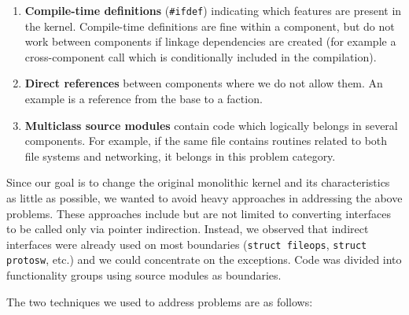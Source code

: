 \begin{enumerate}
\item   \textbf{Compile-time definitions} (\texttt{\#ifdef}) indicating
	which features are present in the kernel.  Compile-time
	definitions are fine within a component, but do not work
	between components if linkage dependencies are created
	(for example a cross-component call which is conditionally
	included in the compilation).

\item   \textbf{Direct references} between components where we do
	not allow them.  An example is a reference from the base
	to a faction.

\item   \textbf{Multiclass source modules} contain code which
	logically belongs in several components.  For example, if
	the same file contains routines related to both file systems
	and networking, it belongs in this problem category.
\end{enumerate}

Since our goal is to change the original monolithic kernel and its
characteristics as little as possible, we wanted to avoid heavy
approaches in addressing the above problems.  These approaches
include but are not limited to converting interfaces to be called only
via pointer indirection.  Instead, we observed that indirect
interfaces were already used on most boundaries (\eg \texttt{struct
fileops}, \texttt{struct protosw}, etc.) and we could concentrate
on the exceptions.  Code was divided into functionality groups
using source modules as boundaries.

The two techniques we used to address problems are as follows:

